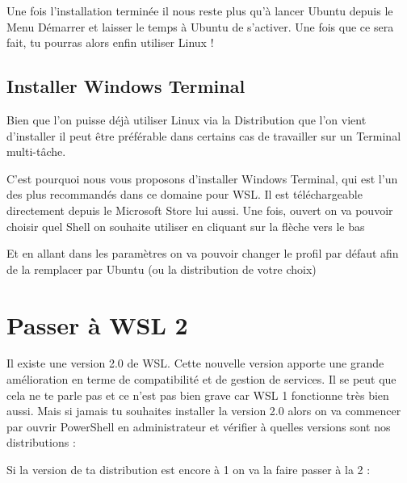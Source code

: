 \documentclass[a4paper, 12pt]{article}
\begin{document}
{    

    Une fois l'installation terminée il nous reste plus qu'à lancer Ubuntu depuis le Menu Démarrer
    et laisser le temps à Ubuntu de s'activer.
    \newline
    Une fois que ce sera fait, tu pourras alors enfin utiliser Linux !
    \vspace{2cm}

    \subsection{Installer Windows Terminal} 

    Bien que l'on puisse déjà utiliser Linux via la Distribution que l'on vient d'installer
    il peut être préférable dans certains cas de travailler sur un Terminal multi-tâche.


    C'est pourquoi nous vous proposons d'installer Windows Terminal, qui est l'un des plus recommandés
    dans ce domaine pour WSL. Il est téléchargeable directement depuis le Microsoft Store lui aussi.
    \newline \newline
    Une fois, ouvert on va pouvoir choisir quel Shell on souhaite utiliser en cliquant sur la flèche
    vers le bas


    \vspace{1cm}
    Et en allant dans les paramètres on va pouvoir changer le profil par défaut afin de la remplacer
    par Ubuntu (ou la distribution de votre choix)
    

    \vspace{2cm}
}

\section{Passer à WSL 2}

{\comfortaa
    Il existe une version 2.0 de WSL. Cette nouvelle version apporte une grande
    amélioration en terme de compatibilité et de gestion de services.
    Il se peut que cela ne te parle pas et ce n'est pas bien grave car WSL 1 fonctionne très bien
    aussi.
    \newline \newline
    Mais si jamais tu souhaites installer la version 2.0 alors on va commencer par
    ouvrir PowerShell en administrateur et vérifier à quelles versions sont \newline
    nos distributions :

    \vspace{0.5cm}

    Si la version de ta distribution est encore à 1 on va la faire passer à la 2 :



}
\end{document}
